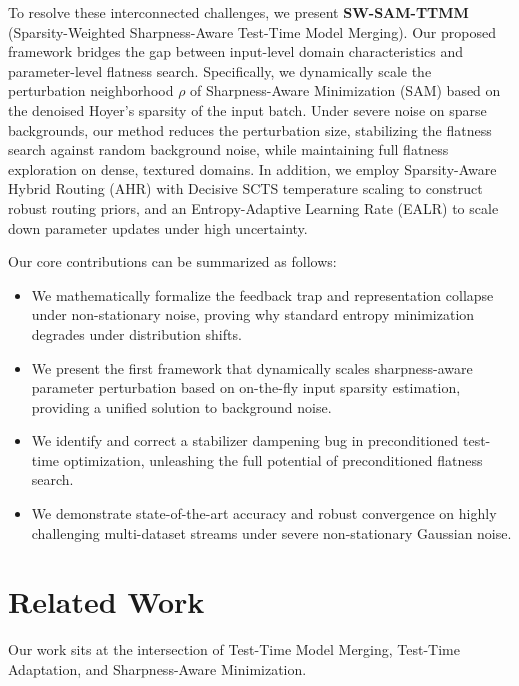 \documentclass{article}
\theoremstyle{plain}
\theoremstyle{definition}
\theoremstyle{remark}
\begin{document}
To resolve these interconnected challenges, we present \textbf{SW-SAM-TTMM} (Sparsity-Weighted Sharpness-Aware Test-Time Model Merging). Our proposed framework bridges the gap between input-level domain characteristics and parameter-level flatness search. Specifically, we dynamically scale the perturbation neighborhood $\rho$ of Sharpness-Aware Minimization (SAM) \cite{foret2020sharpness} based on the denoised Hoyer's sparsity of the input batch. Under severe noise on sparse backgrounds, our method reduces the perturbation size, stabilizing the flatness search against random background noise, while maintaining full flatness exploration on dense, textured domains. In addition, we employ Sparsity-Aware Hybrid Routing (AHR) with Decisive SCTS temperature scaling to construct robust routing priors, and an Entropy-Adaptive Learning Rate (EALR) to scale down parameter updates under high uncertainty.

Our core contributions can be summarized as follows:
\begin{itemize}
  \item We mathematically formalize the feedback trap and representation collapse under non-stationary noise, proving why standard entropy minimization degrades under distribution shifts.
  \item We present the first framework that dynamically scales sharpness-aware parameter perturbation based on on-the-fly input sparsity estimation, providing a unified solution to background noise.
  \item We identify and correct a stabilizer dampening bug in preconditioned test-time optimization, unleashing the full potential of preconditioned flatness search.
  \item We demonstrate state-of-the-art accuracy and robust convergence on highly challenging multi-dataset streams under severe non-stationary Gaussian noise.
\end{itemize}

\section{Related Work}
\label{submission-related-work}

Our work sits at the intersection of Test-Time Model Merging, Test-Time Adaptation, and Sharpness-Aware Minimization.
\end{document}
